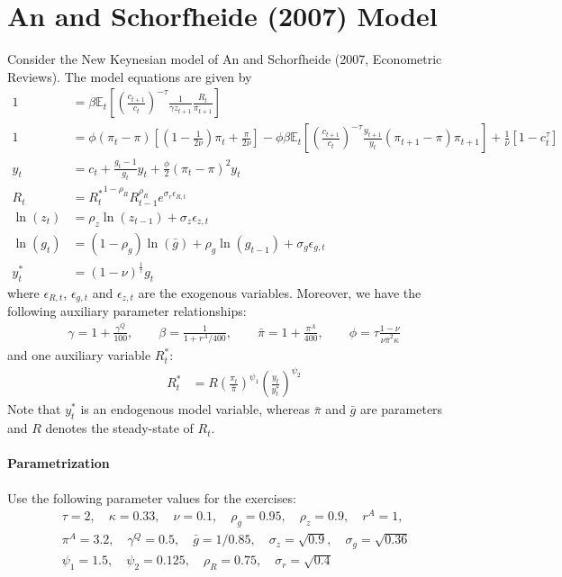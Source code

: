 \documentclass[a4paper]{scrartcl}
\begin{document}
\newpage

\section[An and Schorfheide (2007) Model]{An and Schorfheide (2007) Model\label{ex:AnScho}}
Consider the New Keynesian model of An and Schorfheide (2007, Econometric Reviews).
The model equations are given by 
\begin{align}
1 &= \beta \mathbb{E}_t\left[{\left(\frac{c_{t+1}}{c_t}\right)}^{-\tau} \frac{1}{\gamma z_{t+1}} \frac{R_t}{\pi_{t+1}}\right] \label{eq:AS_B1}
\\
1 &= \phi \left(\pi_t - \pi\right) \left[\left(1-\frac{1}{2\nu}\right)\pi_t + \frac{\pi}{2\nu}\right] - \phi \beta \mathbb{E}_t \left[{\left(\frac{c_{t+1}}{c_t}\right)}^{-\tau} \frac{y_{t+1}}{y_t} \left(\pi_{t+1} - \pi \right) \pi_{t+1}\right] + \frac{1}{\nu}\left[1-c_t^{\tau}\right]
\\
y_t &= c_t + \frac{g_t-1}{g_t} y_t + \frac{\phi}{2} {\left({\pi_t - \pi}\right)}^2 y_t
\\
R_t &= {R_t^{*}}^{1-\rho_R} R_{t-1}^{\rho_R} e^{\sigma_r\epsilon_{R,t}}
\\
\ln(z_t) &= \rho_z \ln(z_{t-1}) + \sigma_z\epsilon_{z,t}
\\
\ln(g_t) &= (1-\rho_g)\ln(\bar{g}) + \rho_g \ln(g_{t-1}) + \sigma_g\epsilon_{g,t}
\\
y_t^* &= {(1-\nu)}^{\frac{1}{\tau}} g_t
\end{align}
where \(\epsilon_{R,t}\), \(\epsilon_{g,t}\) and \(\epsilon_{z,t}\) are the exogenous variables.
Moreover, we have the following auxiliary parameter relationships:
\begin{align*}
\gamma = 1+\frac{\gamma^{Q}}{100}, \qquad
\beta = \frac{1}{1+r^{A}/400}, \qquad
\bar{\pi} = 1+\frac{\pi^{A}}{400}, \qquad
\phi = \tau \frac{1-\nu}{\nu \bar{\pi}^{2}\kappa}
\end{align*}
and one auxiliary variable \(R_t^*\):
\begin{align*}
R_t^* &= R {\left(\frac{\pi_t}{\bar{\pi}}\right)}^{\psi_1} {\left(\frac{y_t}{y_t^*}\right)}^{\psi_2}
\end{align*}
Note that \(y_t^*\) is an endogenous model variable, whereas \(\bar{\pi}\) and \(\bar{g}\) are parameters and \(R\) denotes the steady-state of \(R_t\).

\paragraph{Parametrization}
Use the following parameter values for the exercises:
\begin{align*}
&\tau=2,\quad
\kappa=0.33,\quad
\nu=0.1,\quad
\rho_g=0.95,\quad
\rho_z=0.9,\quad	
r^{A}=1,\quad
\\
&\pi^{A}=3.2,\quad
\gamma^{Q}=0.5,\quad
\bar{g}=1/0.85,\quad
\sigma_z = \sqrt{0.9},\quad
\sigma_g=\sqrt{0.36}
\\
&\psi_1=1.5,\quad \psi_2=0.125,\quad \rho_R = 0.75,\quad \sigma_r = \sqrt{0.4}
\end{align*}
\end{document}
